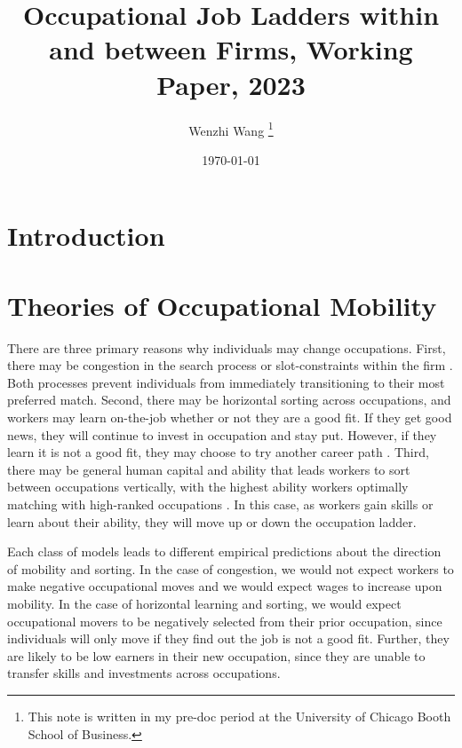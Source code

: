 \documentclass[12pt]{article}
\theoremstyle{definition}
\begin{document}
 


\title{\bf Occupational Job Ladders within and between Firms, Working Paper, 2023} 
\author{Wenzhi Wang \thanks{This note is written in my pre-doc period at the University of Chicago Booth School of Business.} } 
\date{\today} 
\maketitle 

\citet{forsytheOccupationalJobLadders2023}

\section{Introduction}

\section{Theories of Occupational Mobility}

There are three primary reasons why individuals may change occupations. First, there may be congestion in the search process \citep{burdettWageDifferentialsEmployer1998} or slot-constraints within the firm \citep{demouginCareersOngoingHierarchies1994}. Both processes prevent individuals from immediately transitioning to their most preferred match. Second, there may be horizontal sorting across occupations, and workers may learn on-the-job whether or not they are a good fit. If they get good news, they will continue to invest in occupation and stay put. However, if they learn it is not a good fit, they may choose to try another career path \citep{papageorgiouLearningYourComparative2014}. Third, there may be general human capital and ability that leads workers to sort between occupations vertically, with the highest ability workers optimally matching with high-ranked occupations \citep{gibbonsComparativeAdvantageLearning2005}. In this case, as workers gain skills or learn about their ability, they will move up or down the occupation ladder. 

Each class of models leads to different empirical predictions about the direction of mobility and sorting. In the case of congestion, we would not expect workers to make negative occupational moves and we would expect wages to increase upon mobility. In the case of horizontal learning and sorting, we would expect occupational movers to be negatively selected from their prior occupation, since individuals will only move if they find out the job is not a good fit. Further, they are likely to be low earners in their new occupation, since they are unable to transfer skills and investments across occupations. 
\end{document}
